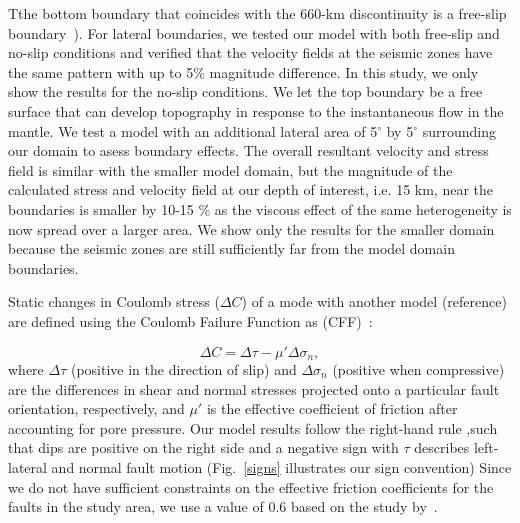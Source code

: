 \documentclass[draft,linenumbers]{agujournal2018}
\begin{document}
Tthe bottom boundary that coincides with the 660-km discontinuity is a free-slip boundary~\citep[e.g.,][]{arcay2007slab, billen2007rheologic, quinquis2011role}). For lateral boundaries, we tested our model with both free-slip and no-slip conditions and verified that the velocity fields at the seismic zones have the same pattern with up to 5\% magnitude difference. In this study, we only show the results for the no-slip conditions. We let the top boundary be a free surface
that can develop topography in response to the instantaneous flow in the mantle. We test a model with an additional lateral area of 5$^{\circ}$ by 5$^{\circ}$ surrounding our domain to asess boundary effects. The overall resultant velocity and stress field is similar with the smaller model domain, but the magnitude of the calculated stress and velocity field at our depth of interest, i.e. 15 km, near the boundaries is smaller by 10-15 \% as the viscous effect of the same heterogeneity is now spread over a larger area. We show only the results for the smaller domain because the seismic zones are still sufficiently far from the model domain boundaries.

Static changes in Coulomb stress ($\Delta C$) of a mode with another model (reference) are defined using the Coulomb Failure Function as (CFF)~\citep{king1994static}:

\begin{equation}
    \Delta C = \Delta \tau - \mu' \Delta \sigma_n,
\end{equation}
%
where $\Delta \tau$ (positive in the direction of slip) and $\Delta\sigma_n$ (positive when compressive) are the differences in shear and normal stresses projected onto a particular fault orientation, respectively, and $\mu'$ is the effective coefficient of friction after accounting for pore pressure. Our model results follow the right-hand rule ,such that dips are positive on the right side and a negative sign with $\tau$ describes left-lateral and normal fault motion (Fig.~\ref{signs} illustrates our sign convention)
Since we do not have sufficient constraints on the effective friction coefficients for the faults in the study area, we use a value of 0.6 based on the study by~\citet{hurd2012intraplate}. 
\end{document}

